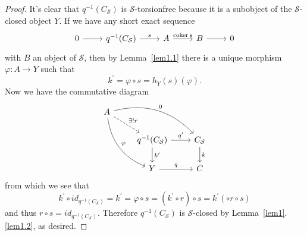 \documentclass[dissertation.tex]{subfiles}
\begin{document}
\begin{lem}
\begin{proof}
    It's clear that $q^{-1}(C_\mathcal{S})$ is $\mathcal{S}$-torsionfree because it is a subobject of the $\mathcal{S}$-closed object $Y$.
    If we have any short exact sequence
    $$\begin{tikzcd}
      0 \arrow{r} & q^{-1}(C_\mathcal{S}) \arrow{r}{s} & A \arrow{r}{\coker{s}} & B \arrow{r} & 0
    \end{tikzcd}$$
    with $B$ an object of $\mathcal{S}$, then by Lemma~\ref{lem1.1} there is a unique morphism $\varphi : A \rightarrow Y$ such that 
    $$k^\prime = \varphi \circ s = h_Y(s)(\varphi).$$
    Now we have the commutative diagram
    $$\begin{tikzcd}
      A \arrow[dashed]{rd}{\exists ! r} \arrow[bend right]{ddr}{\varphi} \arrow[bend left]{rrd}{0}\\
      & q^{-1}(C_\mathcal{S}) \arrow{r}{q^\prime} \arrow{d}{k^\prime} & C_\mathcal{S} \arrow{d}{k}\\
      & Y \arrow{r}{q} & C
    \end{tikzcd}$$
    from which we see that 
    $$k^\prime \circ id_{q^{-1}(C_\mathcal{S})} = k^\prime = \varphi \circ s = (k^\prime \circ r) \circ s = k^\prime (\circ r \circ s)$$
    and thus $r \circ s = id_{q^{-1}(C_\mathcal{S})}.$
    Therefore $q^{-1}(C_\mathcal{S})$ is $\mathcal{S}$-closed by Lemma~\ref{lem1}.\ref{lem1.2}, as desired.
  \end{proof}
\end{lem}
\end{document}
